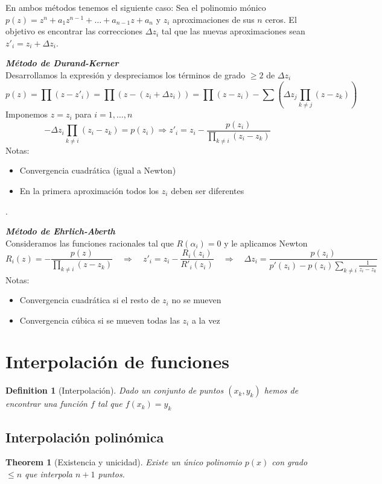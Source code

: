\documentclass[leqno]{article}
\newtheorem*{definition}{Definition}
\newtheorem*{theorem}{Theorem}
\begin{document}
En ambos métodos tenemos el siguiente caso:
Sea el polinomio mónico $p(z)=z^n + a_1z^{n-1} + \ldots + a_{n-1}z + a_n$ y ${z_i}$ aproximaciones de sus  $n$ ceros. El objetivo es encontrar las correcciones $\Delta z_i$ tal que las nuevas aproximaciones sean $z'_i = z_i+\Delta z_i$.

\textit{\textbf{Método de Durand-Kerner}}\\
Desarrollamos la expresión y despreciamos los términos de grado $\ge 2$ de $\Delta z_i$
\[
p(z)=\prod(z-z'_i) = \prod (z-(z_i+\Delta z_i)) = \prod (z-z_i) - \sum  \left( \Delta z_j \prod_{k\neq j}(z-z_k) \right) 
\] 
Imponemos $z=z_i$ para  $i=1,\ldots, n$
\[
-\Delta z_i \prod_{k\neq i} (z_i-z_k) = p(z_i) \Rightarrow \boxed{z'_i = z_i - \frac{p(z_i)}{\prod_{k\neq i}(z_i-z_k)}}
\] 
Notas:
\begin{itemize}[topsep=-6pt, itemsep=0pt]
  \item Convergencia cuadrática (igual a Newton)
  \item En la primera aproximación todos los $z_i$ deben ser diferentes
\end{itemize}
.

\textit{\textbf{Método de Ehrlich-Aberth}}\\
Consideramos las funciones racionales tal que $R(\alpha _i)=0$ y le aplicamos Newton
\[
R_i(z)=-\frac{p(z)}{\prod_{k\neq i}(z-z_k)} \quad \Rightarrow\quad z'_i = z_i -\frac{R_i(z_i)}{R'_i(z_i)}\quad \Rightarrow\quad \boxed{\Delta z_i =  \frac{p(z_i)}{p'(z_i)-p(z_i)\sum_{k\neq i}\frac{1}{z_i-z_k}}}
\] 
Notas:
\begin{itemize}[topsep=-6pt, itemsep=0pt]
  \item Convergencia cuadrática si el resto de $z_i$ no se mueven
  \item Convergencia cúbica si se mueven todas las  $z_i$ a la vez
\end{itemize}




\section{Interpolación de funciones}
\begin{definition}[Interpolación] Dado un conjunto de puntos $(x_k, y_k)$ hemos de encontrar una función  $f$ tal que  $f(x_k)=y_k$
\end{definition}

\subsection{Interpolación polinómica}
\begin{theorem}[Existencia y unicidad]
  Existe un único polinomio $p(x)$ con grado  $\le n$ que interpola $n+1$ puntos.
\end{theorem}
\end{document}
